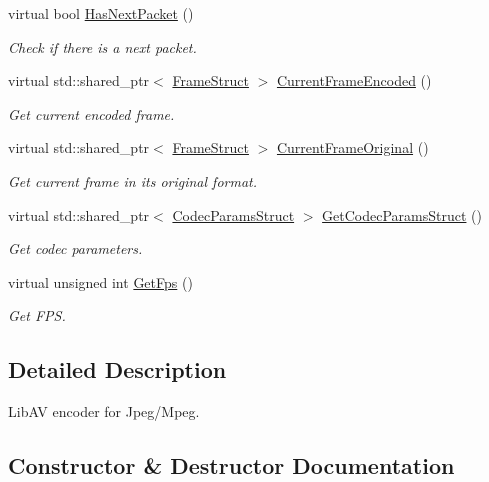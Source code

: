 \begin{DoxyCompactItemize}
virtual bool \hyperlink{classmoetsi_1_1ssp_1_1LibAvEncoder_a306c0935fa37bd35ddfeb8290289e927}{Has\+Next\+Packet} ()
\begin{DoxyCompactList}\small\item\em Check if there is a next packet. \end{DoxyCompactList}\item 
virtual std\+::shared\+\_\+ptr$<$ \hyperlink{structmoetsi_1_1ssp_1_1FrameStruct}{Frame\+Struct} $>$ \hyperlink{classmoetsi_1_1ssp_1_1LibAvEncoder_aedb37703d73b55f1389a122d2ecbe923}{Current\+Frame\+Encoded} ()
\begin{DoxyCompactList}\small\item\em Get current encoded frame. \end{DoxyCompactList}\item 
virtual std\+::shared\+\_\+ptr$<$ \hyperlink{structmoetsi_1_1ssp_1_1FrameStruct}{Frame\+Struct} $>$ \hyperlink{classmoetsi_1_1ssp_1_1LibAvEncoder_a249c65ad557f438d6856e875f01a1947}{Current\+Frame\+Original} ()
\begin{DoxyCompactList}\small\item\em Get current frame in its original format. \end{DoxyCompactList}\item 
virtual std\+::shared\+\_\+ptr$<$ \hyperlink{structmoetsi_1_1ssp_1_1CodecParamsStruct}{Codec\+Params\+Struct} $>$ \hyperlink{classmoetsi_1_1ssp_1_1LibAvEncoder_a2ff6afafbb5da48e900d34d70a46d00c}{Get\+Codec\+Params\+Struct} ()
\begin{DoxyCompactList}\small\item\em Get codec parameters. \end{DoxyCompactList}\item 
virtual unsigned int \hyperlink{classmoetsi_1_1ssp_1_1LibAvEncoder_ae21f81cb967359132183a29e04307933}{Get\+Fps} ()
\begin{DoxyCompactList}\small\item\em Get F\+PS. \end{DoxyCompactList}\end{DoxyCompactItemize}


\subsection{Detailed Description}
Lib\+AV encoder for Jpeg/\+Mpeg. 

\subsection{Constructor \& Destructor Documentation}
\mbox{\label{classmoetsi_1_1ssp_1_1LibAvEncoder_a92b5b4c1f7da0a5cbf30bbf4fe7c89d4}} 
